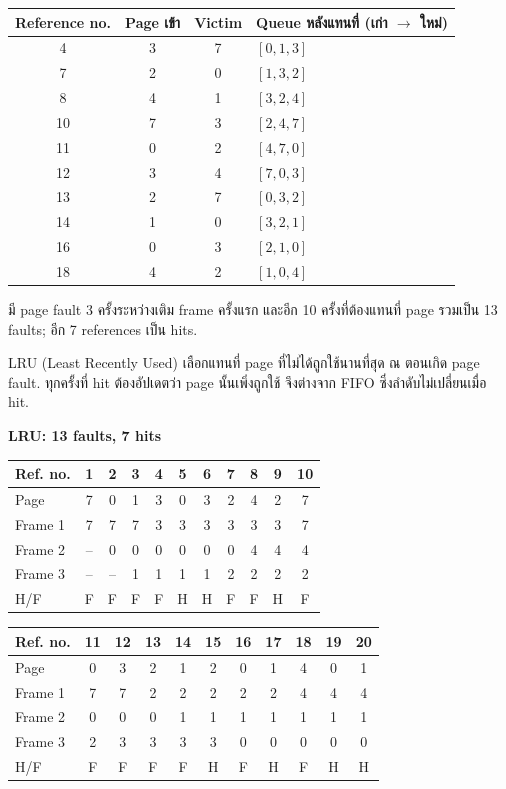 {\small\begin{center}\renewcommand{\arraystretch}{1.12}\begin{tabular}{c|c|c|l}
Reference no. & Page เข้า & Victim & Queue หลังแทนที่ (เก่า $\rightarrow$ ใหม่)\\\hline
4 & 3 & 7 & $[0,1,3]$\\
7 & 2 & 0 & $[1,3,2]$\\
8 & 4 & 1 & $[3,2,4]$\\
10 & 7 & 3 & $[2,4,7]$\\
11 & 0 & 2 & $[4,7,0]$\\
12 & 3 & 4 & $[7,0,3]$\\
13 & 2 & 7 & $[0,3,2]$\\
14 & 1 & 0 & $[3,2,1]$\\
16 & 0 & 3 & $[2,1,0]$\\
18 & 4 & 2 & $[1,0,4]$\\
\end{tabular}\end{center}}
\noindent มี page fault 3 ครั้งระหว่างเติม frame ครั้งแรก และอีก 10 ครั้งที่ต้องแทนที่ page รวมเป็น 13 faults; อีก 7 references เป็น hits.\par
\newpage{}
\noindent LRU (Least Recently Used) เลือกแทนที่ page ที่ไม่ได้ถูกใช้นานที่สุด ณ ตอนเกิด page fault. ทุกครั้งที่ hit ต้องอัปเดตว่า page นั้นเพิ่งถูกใช้ จึงต่างจาก FIFO ซึ่งลำดับไม่เปลี่ยนเมื่อ hit.\par\smallskip
\noindent\textbf{LRU: 13 faults, 7 hits}
{\setlength{\tabcolsep}{5pt}\begin{center}\renewcommand{\arraystretch}{1.15}\begin{tabular}{l|cccccccccc}
Ref. no. & 1 & 2 & 3 & 4 & 5 & 6 & 7 & 8 & 9 & 10\\\hline
Page & 7 & 0 & 1 & 3 & 0 & 3 & 2 & 4 & 2 & 7\\
Frame 1 & 7 & 7 & 7 & 3 & 3 & 3 & 3 & 3 & 3 & 7\\
Frame 2 & -- & 0 & 0 & 0 & 0 & 0 & 0 & 4 & 4 & 4\\
Frame 3 & -- & -- & 1 & 1 & 1 & 1 & 2 & 2 & 2 & 2\\
H/F & F & F & F & F & H & H & F & F & H & F\\
\end{tabular}\end{center}}
{\setlength{\tabcolsep}{5pt}\begin{center}\renewcommand{\arraystretch}{1.15}\begin{tabular}{l|cccccccccc}
Ref. no. & 11 & 12 & 13 & 14 & 15 & 16 & 17 & 18 & 19 & 20\\\hline
Page & 0 & 3 & 2 & 1 & 2 & 0 & 1 & 4 & 0 & 1\\
Frame 1 & 7 & 7 & 2 & 2 & 2 & 2 & 2 & 4 & 4 & 4\\
Frame 2 & 0 & 0 & 0 & 1 & 1 & 1 & 1 & 1 & 1 & 1\\
Frame 3 & 2 & 3 & 3 & 3 & 3 & 0 & 0 & 0 & 0 & 0\\
H/F & F & F & F & F & H & F & H & F & H & H\\
\end{tabular}\end{center}}
